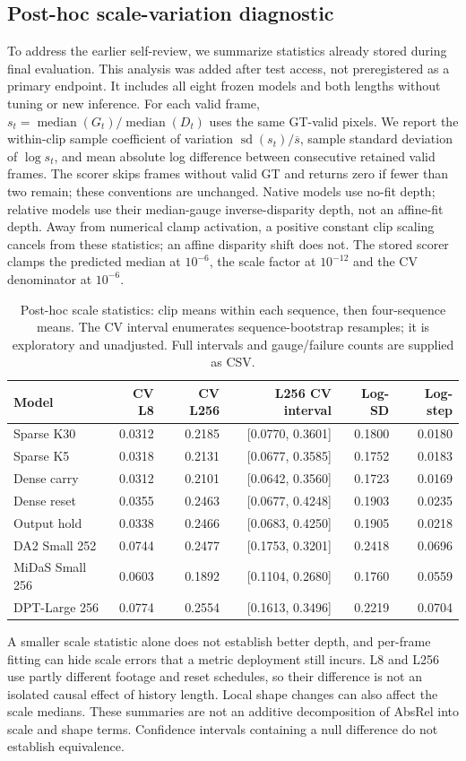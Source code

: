 \subsection{Post-hoc scale-variation diagnostic}
To address the earlier self-review, we summarize statistics already stored during final evaluation. This analysis was added after test access, not preregistered as a primary endpoint. It includes all eight frozen models and both lengths without tuning or new inference. For each valid frame, $s_t=\operatorname{median}(G_t)/\operatorname{median}(D_t)$ uses the same GT-valid pixels. We report the within-clip sample coefficient of variation $\operatorname{sd}(s_t)/\overline{s}$, sample standard deviation of $\log s_t$, and mean absolute log difference between consecutive retained valid frames. The scorer skips frames without valid GT and returns zero if fewer than two remain; these conventions are unchanged. Native models use no-fit depth; relative models use their median-gauge inverse-disparity depth, not an affine-fit depth. Away from numerical clamp activation, a positive constant clip scaling cancels from these statistics; an affine disparity shift does not. The stored scorer clamps the predicted median at $10^{-6}$, the scale factor at $10^{-12}$ and the CV denominator at $10^{-6}$.
\begin{table}[H]
\caption{Post-hoc scale statistics: clip means within each sequence, then four-sequence means. The CV interval enumerates sequence-bootstrap resamples; it is exploratory and unadjusted. Full intervals and gauge/failure counts are supplied as CSV.}\label{tab:scale}
\centering\small
\begin{tabular}{lrrrrr}\toprule
Model & CV L8 & CV L256 & L256 CV interval & Log-SD & Log-step \\
\midrule
Sparse K30 & 0.0312 & 0.2185 & [0.0770, 0.3601] & 0.1800 & 0.0180 \\
Sparse K5 & 0.0318 & 0.2131 & [0.0677, 0.3585] & 0.1752 & 0.0183 \\
Dense carry & 0.0312 & 0.2101 & [0.0642, 0.3560] & 0.1723 & 0.0169 \\
Dense reset & 0.0355 & 0.2463 & [0.0677, 0.4248] & 0.1903 & 0.0235 \\
Output hold & 0.0338 & 0.2466 & [0.0683, 0.4250] & 0.1905 & 0.0218 \\
DA2 Small 252 & 0.0744 & 0.2477 & [0.1753, 0.3201] & 0.2418 & 0.0696 \\
MiDaS Small 256 & 0.0603 & 0.1892 & [0.1104, 0.2680] & 0.1760 & 0.0559 \\
DPT-Large 256 & 0.0774 & 0.2554 & [0.1613, 0.3496] & 0.2219 & 0.0704 \\
\bottomrule\end{tabular}
\end{table}
A smaller scale statistic alone does not establish better depth, and per-frame fitting can hide scale errors that a metric deployment still incurs. L8 and L256 use partly different footage and reset schedules, so their difference is not an isolated causal effect of history length. Local shape changes can also affect the scale medians. These summaries are not an additive decomposition of AbsRel into scale and shape terms. Confidence intervals containing a null difference do not establish equivalence.
